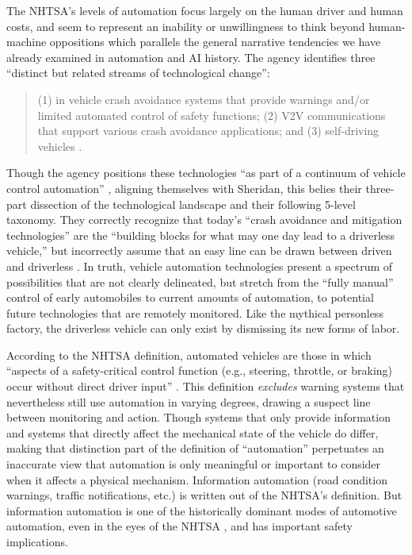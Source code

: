 The NHTSA's levels of automation focus largely on the human driver and
human costs, and seem to represent an inability or unwillingness to
think beyond human-machine oppositions which 
parallels the general narrative tendencies we have already examined in
automation and AI history. 
The agency identifies three ``distinct but related streams of
technological change'': 
\begin{quote}
(1) in vehicle crash avoidance systems that provide warnings and/or
limited automated control of safety functions; (2) V2V communications
that support various crash avoidance applications; and (3)
self-driving vehicles \cite[p. 3]{NHTSA}.\end{quote}
Though the agency positions these technologies ``as part of a
continuum of vehicle control automation'' \cite[p. 3]{NHTSA}, aligning
themselves with Sheridan, this belies
their three-part dissection of the technological landscape and their
following 5-level taxonomy. They correctly recognize that today's
``crash avoidance and mitigation technologies'' are the ``building blocks
for what may one day lead to a driverless vehicle,'' but incorrectly
assume that an easy line can be drawn between driven and
driverless \cite[p. 3]{NHTSA}. In truth, vehicle automation
technologies present a spectrum of possibilities that are not clearly
delineated, but stretch from the ``fully manual'' control of early
automobiles to current amounts of automation, to potential future
technologies that are remotely monitored. Like the mythical personless
factory, the driverless vehicle can only exist by dismissing its new forms
of labor. 


According to the NHTSA definition, automated
vehicles are those in which ``aspects of a safety-critical control
function (e.g., steering, throttle, or braking) occur without direct
driver input'' \cite[p. 3]{NHTSA}. This definition \emph{excludes} warning
systems that nevertheless still use automation in varying degrees,
drawing a suspect line between monitoring and action. Though systems
that only provide information and systems 
that directly affect the mechanical state of the vehicle do differ, making that
distinction part of the definition of ``automation'' perpetuates an
inaccurate view that automation is only meaningful or important to
consider when it affects a physical mechanism. Information automation
(road condition warnings, traffic notifications, etc.)
is written out of the NHTSA's definition. But information automation
is one of the historically dominant modes of automotive automation,
even in the eyes of the NHTSA \cite[p. 11]{wetmore}, and has important
safety implications.

